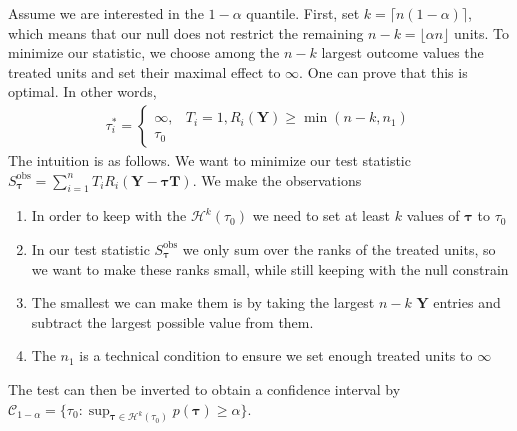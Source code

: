\documentclass[11pt]{exam}
\theoremstyle{plain}
\begin{document}
Assume we are interested in the $1-\alpha$ quantile.
First, set $k = \lceil n(1-\alpha) \rceil$, which means that our null does not restrict the remaining $n - k = \lfloor \alpha n \rfloor$ units. To minimize our statistic, we choose among the $n-k$ largest outcome values the treated units and set their maximal effect to $\infty$. One can prove that this is optimal. In other words,
\begin{align*}
    \tau^\ast_i = \begin{cases}
        \infty, & T_i = 1, R_i(\bm{Y}) \geq \min(n-k, n_1)
        \\
        \tau_0
    \end{cases}
\end{align*}
The intuition is as follows. We want to minimize our test statistic $S^{\text{obs}}_{\bm \tau} = \sum_{i=1}^n T_i R_i(\bm{Y} - \bm \tau \bm T)$. We make the observations
\begin{enumerate}
    \item In order to keep with the $\mathcal{H}^k(\tau_0)$ we need to set at least $k$ values of $\bm \tau$ to $\tau_0$
    \item In our test statistic $S^{\text{obs}}_{\bm \tau}$ we only sum over the ranks of the treated units, so we want to make these ranks small, while still keeping with the null constrain
    \item The smallest we can make them is by taking the largest $n-k$ $\bm{Y}$ entries and subtract the largest possible value from them.
    \item The $n_1$ is a technical condition to ensure we set enough treated units to $\infty$
\end{enumerate}
The test can then be inverted to obtain a confidence interval by $\mathcal{C}_{1 - \alpha} = \{\tau_0: \sup_{\bm{\tau} \in \mathcal{H}^k(\tau_0)} p(\bm \tau) \geq \alpha \}$.

\endgroup


\end{document}
